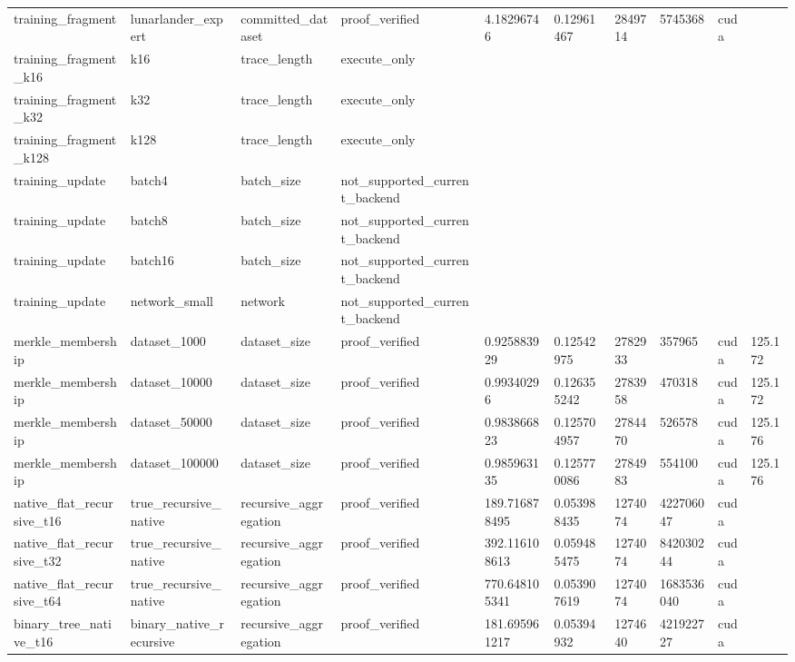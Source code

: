 \begin{table}[t]
\begin{tabular}{lllllllll}
training\_fragment & lunarlander\_expert & committed\_dataset & proof\_verified & 4.18296746 & 0.12961467 & 2849714 & 5745368 & cuda &  \\
training\_fragment\_k16 & k16 & trace\_length & execute\_only &  &  &  &  &  &  \\
training\_fragment\_k32 & k32 & trace\_length & execute\_only &  &  &  &  &  &  \\
training\_fragment\_k128 & k128 & trace\_length & execute\_only &  &  &  &  &  &  \\
training\_update & batch4 & batch\_size & not\_supported\_current\_backend &  &  &  &  &  &  \\
training\_update & batch8 & batch\_size & not\_supported\_current\_backend &  &  &  &  &  &  \\
training\_update & batch16 & batch\_size & not\_supported\_current\_backend &  &  &  &  &  &  \\
training\_update & network\_small & network & not\_supported\_current\_backend &  &  &  &  &  &  \\
merkle\_membership & dataset\_1000 & dataset\_size & proof\_verified & 0.925883929 & 0.12542975 & 2782933 & 357965 & cuda & 125.172 \\
merkle\_membership & dataset\_10000 & dataset\_size & proof\_verified & 0.99340296 & 0.126355242 & 2783958 & 470318 & cuda & 125.172 \\
merkle\_membership & dataset\_50000 & dataset\_size & proof\_verified & 0.983866823 & 0.125704957 & 2784470 & 526578 & cuda & 125.176 \\
merkle\_membership & dataset\_100000 & dataset\_size & proof\_verified & 0.985963135 & 0.125770086 & 2784983 & 554100 & cuda & 125.176 \\
native\_flat\_recursive\_t16 & true\_recursive\_native & recursive\_aggregation & proof\_verified & 189.716878495 & 0.053988435 & 1274074 & 422706047 & cuda &  \\
native\_flat\_recursive\_t32 & true\_recursive\_native & recursive\_aggregation & proof\_verified & 392.116108613 & 0.059485475 & 1274074 & 842030244 & cuda &  \\
native\_flat\_recursive\_t64 & true\_recursive\_native & recursive\_aggregation & proof\_verified & 770.648105341 & 0.053907619 & 1274074 & 1683536040 & cuda &  \\
binary\_tree\_native\_t16 & binary\_native\_recursive & recursive\_aggregation & proof\_verified & 181.695961217 & 0.05394932 & 1274640 & 421922727 & cuda &  \\

\end{tabular}
\end{table}
